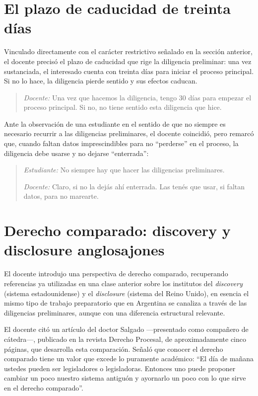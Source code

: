 \documentclass[12pt,oneside]{book}
\begin{document}
\section{El plazo de caducidad de treinta días}

Vinculado directamente con el carácter restrictivo señalado en la sección anterior, el docente precisó el plazo de caducidad que rige la diligencia preliminar: una vez sustanciada, el interesado cuenta con treinta días para iniciar el proceso principal. Si no lo hace, la diligencia pierde sentido y sus efectos caducan.

\begin{quote}
\textit{Docente:} Una vez que hacemos la diligencia, tengo 30 días para empezar el proceso principal. Si no, no tiene sentido esta diligencia que hice.
\end{quote}

Ante la observación de una estudiante en el sentido de que no siempre es necesario recurrir a las diligencias preliminares, el docente coincidió, pero remarcó que, cuando faltan datos imprescindibles para no ``perderse'' en el proceso, la diligencia debe usarse y no dejarse ``enterrada'':

\begin{quote}
\textit{Estudiante:} No siempre hay que hacer las diligencias preliminares.

\textit{Docente:} Claro, si no la dejás ahí enterrada. Las tenés que usar, si faltan datos, para no marearte.
\end{quote}

\section{Derecho comparado: discovery y disclosure anglosajones}

El docente introdujo una perspectiva de derecho comparado, recuperando referencias ya utilizadas en una clase anterior sobre los institutos del \textit{discovery} (sistema estadounidense) y el \textit{disclosure} (sistema del Reino Unido), en esencia el mismo tipo de trabajo preparatorio que en Argentina se canaliza a través de las diligencias preliminares, aunque con una diferencia estructural relevante.

\begin{note}
El docente citó un artículo del doctor Salgado —presentado como compañero de cátedra—, publicado en la revista Derecho Procesal, de aproximadamente cinco páginas, que desarrolla esta comparación. Señaló que conocer el derecho comparado tiene un valor que excede lo puramente académico: ``El día de mañana ustedes pueden ser legisladores o legisladoras. Entonces uno puede proponer cambiar un poco nuestro sistema antiguón y ayornarlo un poco con lo que sirve en el derecho comparado''.
\end{note}
\end{document}
